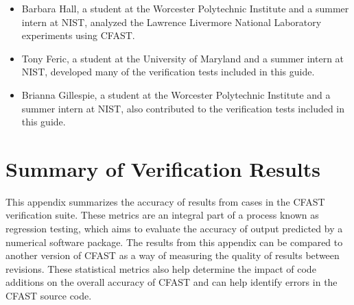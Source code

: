 \documentclass[12pt]{book}
\begin{document}
\begin{itemize}
\item Barbara Hall, a student at the Worcester Polytechnic Institute and a summer intern at NIST, analyzed the Lawrence Livermore National Laboratory experiments using CFAST.

\item Tony Feric, a student at the University of Maryland and a summer intern at NIST, developed many of the verification tests included in this guide.

\item Brianna Gillespie, a student at the Worcester Polytechnic Institute and a summer intern at NIST, also contributed to the verification tests included in this guide.

\end{itemize}

\cleardoublepage
{}
{}
\tableofcontents

\cleardoublepage
{}
{}
\listoffigures

\cleardoublepage
{}
{}
\listoftables

\mainmatter








%








\printbibliography[heading=bibintoc,title={References}]

\appendix
{}



\chapter{Summary of Verification Results}
\label{info:verification_statistics}

This appendix summarizes the accuracy of results from cases in the CFAST verification suite. These metrics are an integral part of a process known as regression testing, which aims to evaluate the accuracy of output predicted by a numerical software package. The results from this appendix can be compared to another version of CFAST as a way of measuring the quality of results between revisions. These statistical metrics also help determine the impact of code additions on the overall accuracy of CFAST and can help identify errors in the CFAST source code.
\end{document}
